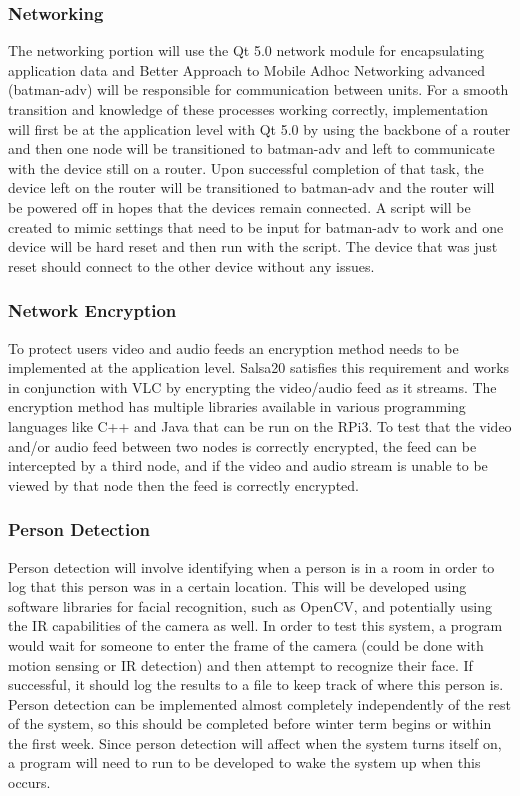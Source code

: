 \documentclass[onecolumn, draftclsnofoot,10pt, compsoc]{IEEEtran}
\begin{document}
\subsubsection{Networking}
The networking portion will use the Qt 5.0 network module for encapsulating application data and Better Approach to Mobile Adhoc Networking advanced (batman-adv) will be responsible for communication between units. For a smooth transition and knowledge of these processes working correctly, implementation will first be at the application level with Qt 5.0 by using the backbone of a router and then one node will be transitioned to batman-adv and left to communicate with the device still on a router. Upon successful completion of that task, the device left on the router will be transitioned to batman-adv and the router will be powered off in hopes that the devices remain connected. A script will be created to mimic settings that need to be input for batman-adv to work and one device will be hard reset and then run with the script. The device that was just reset should connect to the other device without any issues.

\subsubsection{Network Encryption}
To protect users video and audio feeds an encryption method needs to be implemented at the application level.
Salsa20 satisfies this requirement and works in conjunction with VLC by encrypting the video/audio feed as it streams. The encryption method has multiple libraries available in various programming languages like C++ and Java that can be run on the RPi3.
To test that the video and/or audio feed between two nodes is correctly encrypted, the feed can be intercepted by a third node, and if the video and audio stream is unable to be viewed by that node then the feed is correctly encrypted.

\subsubsection{Person Detection}
Person detection will involve identifying when a person is in a room in order to log that this person was in a certain location. This will be developed using software libraries for facial recognition, such as OpenCV, and potentially using the IR capabilities of the camera as well. In order to test this system, a program would wait for someone to enter the frame of the camera (could be done with motion sensing or IR detection) and then attempt to recognize their face. If successful, it should log the results to a file to keep track of where this person is. Person detection can be implemented almost completely independently of the rest of the system, so this should be completed before winter term begins or within the first week. Since person detection will affect when the system turns itself on, a program will need to run to be developed to wake the system up when this occurs.
\end{document}
